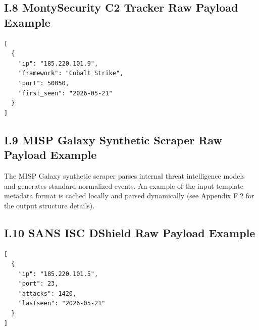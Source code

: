 \subsection*{I.8 MontySecurity C2 Tracker Raw Payload Example}
\begin{verbatim}
[
  {
    "ip": "185.220.101.9",
    "framework": "Cobalt Strike",
    "port": 50050,
    "first_seen": "2026-05-21"
  }
]
\end{verbatim}

\subsection*{I.9 MISP Galaxy Synthetic Scraper Raw Payload Example}
The MISP Galaxy synthetic scraper parses internal threat intelligence models and generates standard normalized events. An example of the input template metadata format is cached locally and parsed dynamically (see Appendix F.2 for the output structure details).

\subsection*{I.10 SANS ISC DShield Raw Payload Example}
\begin{verbatim}
[
  {
    "ip": "185.220.101.5",
    "port": 23,
    "attacks": 1420,
    "lastseen": "2026-05-21"
  }
]
\end{verbatim}

